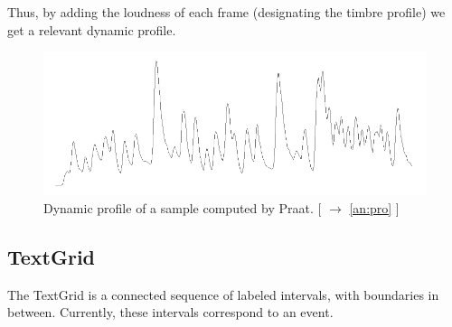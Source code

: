 Thus, by adding the loudness of each frame (designating the timbre profile) we get a relevant dynamic profile.

\begin{figure}[!hbt]
	\begin{center}
		\includegraphics[width=\textwidth]{img/9832}
		\caption{Dynamic profile of a sample computed by Praat. [ $\rightarrow$ \ref{an:pro} ]}
		\label{fig:g1}
	\end{center}
\end{figure}

\subsection{TextGrid}

The TextGrid is a connected sequence of labeled intervals, with boundaries in between. Currently, these intervals correspond to an event.

